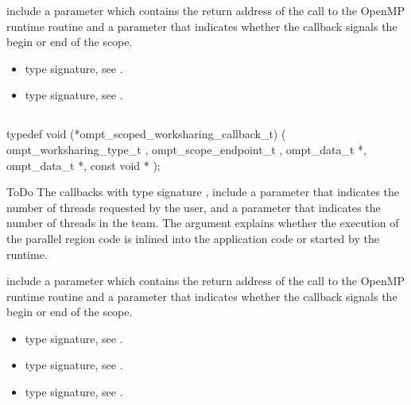 include a parameter  which contains the return address of the
call to the OpenMP runtime routine and a parameter 
that indicates whether the callback signals the begin or end of the scope.

\crossreferences
\begin{itemize}
\item {} type signature, see
.
\item {} type signature, see
.
\end{itemize}



\subsection{}
\label{subsec:ompt_scoped_worksharing_callback_t}
\format
\begin{boxedcode}
typedef void (*ompt\_scoped\_worksharing\_callback\_t) (
  ompt\_worksharing\_type\_t ,
  ompt\_scope\_endpoint\_t ,
  ompt\_data\_t *,
  ompt\_data\_t *,
  const void *
);
\end{boxedcode}
\descr ToDo
The callbacks with type signature ,
include a parameter 
that indicates the number of threads requested by the user, and a parameter
 that indicates the number of threads in the team.
The  argument explains whether the execution of the parallel
region code is inlined into the application code or started by the runtime.

include a parameter  which contains the return address of the
call to the OpenMP runtime routine and a parameter 
that indicates whether the callback signals the begin or end of the scope.

\crossreferences
\begin{itemize}
\item {} type signature, see
.
\item {} type signature, see
.
\item {} type signature, see
.
\end{itemize}



